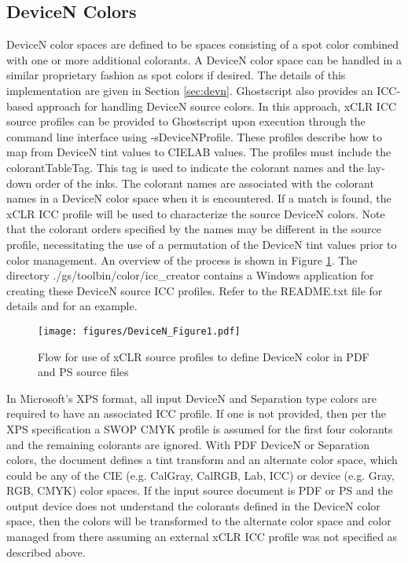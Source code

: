 \documentclass[12pt,notitlepage]{article}
\begin{document}
\subsection{DeviceN Colors}

DeviceN color spaces are defined to be spaces consisting of a spot color combined with one or more additional colorants. A DeviceN color space can be handled in a similar proprietary fashion as spot colors if desired.
 The details of this implementation are given in Section \ref{sec:devn}.  Ghostscript also provides an ICC-based approach for handling DeviceN source colors.  In this approach, xCLR ICC source profiles can be provided to Ghostscript upon execution through the command line interface using -sDeviceNProfile.  These profiles describe how to map from DeviceN tint values to CIELAB values.  The profiles must include the colorantTableTag.  This tag is used to indicate the colorant names and the lay-down order of the inks.  The colorant names are associated with the colorant names in a DeviceN color space when it is encountered.  If a match is found, the xCLR ICC profile will be used to characterize the source DeviceN colors.  Note that the colorant orders specified by the names may be different in the source profile, necessitating the use of a permutation of the DeviceN tint values prior to color management.  An overview of the process is shown in Figure \ref{fig:DeviceN}.  The directory ./gs/toolbin/color/icc\_creator contains a Windows application for creating these DeviceN source ICC profiles.  Refer to the README.txt file for details and for an example.

\begin{figure}
    \begin{center}
\texttt{[image: figures/DeviceN\_Figure1.pdf]}
    \end{center}
   \caption{Flow for use of xCLR source profiles to define DeviceN color in PDF and PS source files }
    \label{fig:DeviceN}
\end{figure}

In Microsoft's XPS format, all input DeviceN and Separation type colors are required to have an associated ICC profile.  If one is not provided, then per the XPS specification\cite{XPS} a SWOP CMYK profile is assumed for the first four colorants and the remaining colorants are ignored. With PDF DeviceN or Separation colors, the document defines a tint transform and an alternate color space, which could be any of the CIE (e.g. CalGray, CalRGB, Lab, ICC) or device (e.g. Gray, RGB, CMYK) color spaces.  If the input source document is PDF or PS and the output device does not understand the colorants defined in the DeviceN color space, then the colors will be transformed to the alternate color space and color managed from there assuming an external xCLR ICC profile was not specified as described above.
\end{document}
